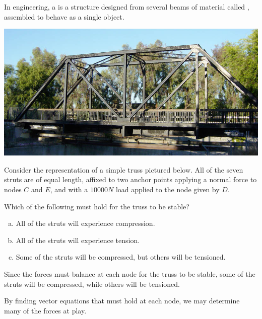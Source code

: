 \begin{applicationActivities}

\begin{example}
In engineering, a  is a structure designed from several beams
of material called , assembled to behave as a single object.

\begin{center}
\includegraphics[width=0.8\linewidth]{media/truss.jpg}
\end{center}
\end{example}

\begin{activity}{5}
Consider the representation of a simple truss pictured below.
All of the seven struts are of equal length, affixed to two anchor points
applying a normal force to nodes \(C\) and \(E\), and
with a \(10000 N\) load applied to the node given by \(D\).

\drawtruss{}

Which of the following must hold for the truss to be stable?
\begin{enumerate}[a)]
\item All of the struts will experience compression.
\item All of the struts will experience tension.
\item Some of the struts will be compressed, but others will be tensioned.
\end{enumerate}
\end{activity}

\begin{observation}
Since the forces must balance at each node for the truss to be stable,
some of the struts will be compressed, while others will be tensioned. 

\drawtruss{\trussCompletion}

By finding vector equations that must hold at each node, we may
determine many of the forces at play.
\end{observation}


\end{applicationActivities}
